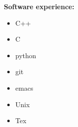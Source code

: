 \documentclass[a4paper,10pt]{article} %
\begin{document}
\textbf{Software experience:}
\begin{itemize}[noitemsep]
\item C++
\item C
\item python
\item git
\item emacs
\item Unix
\item Tex
\end{itemize}








\end{document}
